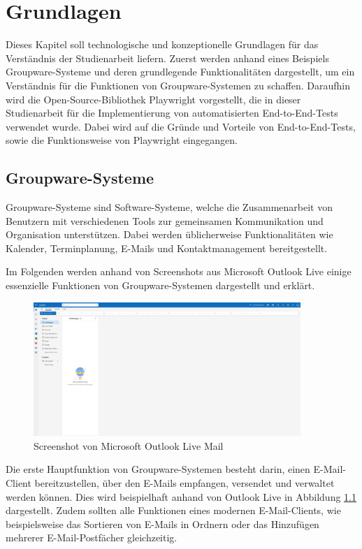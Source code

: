 \chapter{Grundlagen}

Dieses Kapitel soll technologische und konzeptionelle Grundlagen für das Verständnis der Studienarbeit liefern.
Zuerst werden anhand eines Beispiels Groupware-Systeme und deren grundlegende Funktionalitäten dargestellt, um ein Verständnis für die Funktionen von Groupware-Systemen zu schaffen.
Daraufhin wird die Open-Source-Bibliothek Playwright vorgestellt, die in dieser Studienarbeit für die Implementierung von automatisierten End-to-End-Tests verwendet wurde.
Dabei wird auf die Gründe und Vorteile von End-to-End-Tests, sowie die Funktionsweise von Playwright eingegangen.

\section{Groupware-Systeme}

Groupware-Systeme sind Software-Systeme, welche die Zusammenarbeit von Benutzern mit verschiedenen Tools zur gemeinsamen Kommunikation und Organisation unterstützen.
Dabei werden üblicherweise Funktionalitäten wie Kalender, Terminplanung, E-Mails und Kontaktmanagement bereitgestellt.

Im Folgenden werden anhand von Screenshots aus Microsoft Outlook Live einige essenzielle Funktionen von Groupware-Systemen dargestellt und erklärt.
\begin{figure}[H]
    \centering
    \includegraphics[width=0.9\textwidth]{images/OutlookLive_Mail1.png}
    \caption{Screenshot von Microsoft Outlook Live Mail}
    \label{fig:outlook-live-mail}
\end{figure}
Die erste Hauptfunktion von Groupware-Systemen besteht darin, einen E-Mail-Client bereitzustellen, über den E-Mails empfangen, versendet und verwaltet werden können. Dies wird beispielhaft anhand von Outlook Live in Abbildung \ref{fig:outlook-live-mail} dargestellt.
Zudem sollten alle Funktionen eines modernen E-Mail-Clients, wie beispielsweise das Sortieren von E-Mails in Ordnern oder das Hinzufügen mehrerer E-Mail-Postfächer gleichzeitig.


